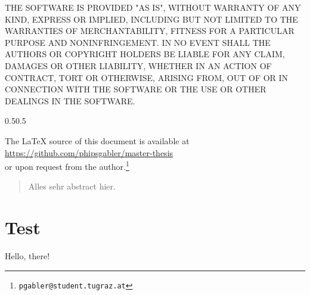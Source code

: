 \documentclass[11pt,a4paper,twoside,draft]{memoir}
\begin{document}
\begin{adjustwidth}{\absleftindent}{\absrightindent}
\begin{ttfamily}
    THE SOFTWARE IS PROVIDED "AS IS", WITHOUT WARRANTY OF ANY KIND, EXPRESS OR IMPLIED, INCLUDING
    BUT NOT LIMITED TO THE WARRANTIES OF MERCHANTABILITY, FITNESS FOR A PARTICULAR PURPOSE AND
    NON\-IN\-FRINGE\-MENT. IN NO EVENT SHALL THE AUTHORS OR COPYRIGHT HOLDERS BE LIABLE FOR ANY
    CLAIM, DAMAGES OR OTHER LIABILITY, WHETHER IN AN ACTION OF CONTRACT, TORT OR OTHERWISE, ARISING
    FROM, OUT OF OR IN CONNECTION WITH THE SOFTWARE OR THE USE OR OTHER DEALINGS IN THE SOFTWARE.
  \end{ttfamily}
  
  \vspace{2ex}
  
  \begin{adjustwidth}{0.5\absleftindent}{0.5\absrightindent}
    \begin{Center}

      The \LaTeX{} source of this document is available at\\
      \url{https://github.com/phipsgabler/master-thesis} \\
      or upon request from the author.\footnote{\texttt{pgabler@student.tugraz.at}}
    \end{Center}
  \end{adjustwidth}
  

\end{adjustwidth}

\movetooddpage
{}
\label{abstract}
\begin{abstract}

\noindent
Alles sehr abstract hier.

\end{abstract}

\begingroup
\cleartorecto
\hypersetup{linkcolor=black, hyperindex=true}
\label{toc}
\tableofcontents*
\endgroup

\cleartorecto
\mainmatter


\chapter{Test}
Hello, there!
\end{document}
